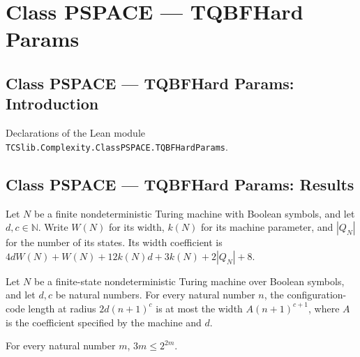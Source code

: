 \section{Class PSPACE --- TQBFHard Params}
\subsection*{Class PSPACE --- TQBFHard Params: Introduction}

Declarations of the Lean module \texttt{TCSlib.Complexity.ClassPSPACE.TQBFHardParams}.

\subsection*{Class PSPACE --- TQBFHard Params: Results}

\begin{definition}
\label{Complexity.TQBFHard.wCoef}
\leanok
{}
Let $N$ be a finite nondeterministic Turing machine with Boolean symbols, and let
$d,c\in\mathbb{N}$. Write $W(N)$ for its width, $k(N)$ for its machine parameter, and
$|Q_N|$ for the number of its states. Its width coefficient is
$4dW(N)+W(N)+12k(N)d+3k(N)+2|Q_N|+8$.
\end{definition}

\begin{theorem}
\label{Complexity.TQBFHard.vlen_le_vwid}
\leanok
{}
Let $N$ be a finite-state nondeterministic Turing machine over Boolean symbols, and let
$d,c$ be natural numbers. For every natural number $n$, the configuration-code length at
radius $2d(n+1)^c$ is at most the width $A(n+1)^{c+1}$, where $A$ is the coefficient
specified by the machine and $d$.
\end{theorem}

\begin{theorem}
\label{Complexity.TQBFHard.three_mul_le}
\leanok
{}
For every natural number $m$, $3m\le 2^{2m}$.
\end{theorem}

